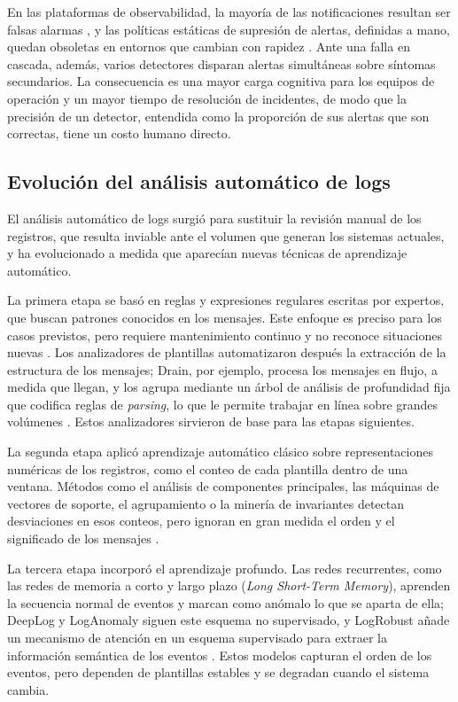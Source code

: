 En las plataformas de observabilidad, la mayoría de las notificaciones resultan ser falsas alarmas \cite{allam2023_aiops}, y las políticas estáticas de supresión de alertas, definidas a mano, quedan obsoletas en entornos que cambian con rapidez \cite{bhukar2024_alertsuppression}. Ante una falla en cascada, además, varios detectores disparan alertas simultáneas sobre síntomas secundarios. La consecuencia es una mayor carga cognitiva para los equipos de operación y un mayor tiempo de resolución de incidentes, de modo que la precisión de un detector, entendida como la proporción de sus alertas que son correctas, tiene un costo humano directo.

\subsection{Evolución del análisis automático de logs}\label{sec:ant_evolucion_logs}

El análisis automático de logs surgió para sustituir la revisión manual de los registros, que resulta inviable ante el volumen que generan los sistemas actuales, y ha evolucionado a medida que aparecían nuevas técnicas de aprendizaje automático.

La primera etapa se basó en reglas y expresiones regulares escritas por expertos, que buscan patrones conocidos en los mensajes. Este enfoque es preciso para los casos previstos, pero requiere mantenimiento continuo y no reconoce situaciones nuevas \cite{he2021_survey}. Los analizadores de plantillas automatizaron después la extracción de la estructura de los mensajes; Drain, por ejemplo, procesa los mensajes en flujo, a medida que llegan, y los agrupa mediante un árbol de análisis de profundidad fija que codifica reglas de \textit{parsing}, lo que le permite trabajar en línea sobre grandes volúmenes \cite{he2017_drain}. Estos analizadores sirvieron de base para las etapas siguientes.

La segunda etapa aplicó aprendizaje automático clásico sobre representaciones numéricas de los registros, como el conteo de cada plantilla dentro de una ventana. Métodos como el análisis de componentes principales, las máquinas de vectores de soporte, el agrupamiento o la minería de invariantes detectan desviaciones en esos conteos, pero ignoran en gran medida el orden y el significado de los mensajes \cite{he2021_survey} \cite{jiang2021_aiops}.

La tercera etapa incorporó el aprendizaje profundo. Las redes recurrentes, como las redes de memoria a corto y largo plazo (\textit{Long Short-Term Memory}), aprenden la secuencia normal de eventos y marcan como anómalo lo que se aparta de ella; DeepLog y LogAnomaly siguen este esquema no supervisado, y LogRobust añade un mecanismo de atención en un esquema supervisado para extraer la información semántica de los eventos \cite{jiang2021_aiops} \cite{he2021_survey}. Estos modelos capturan el orden de los eventos, pero dependen de plantillas estables y se degradan cuando el sistema cambia.

